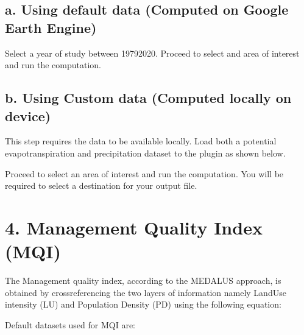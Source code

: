\documentclass[letterpaper,10pt,english]{sphinxmanual}
\begin{document}
\subsection{a. Using default data (Computed on Google Earth Engine)}
\label{\detokenize{Qgis_Plugin/Calculate_medalus:id1}}
\sphinxAtStartPar
Select a year of study between 1979\sphinxhyphen{}2020. Proceed to select and area of interest and run the computation.



\subsection{b. Using Custom data (Computed locally on device)}
\label{\detokenize{Qgis_Plugin/Calculate_medalus:id2}}
\sphinxAtStartPar
This step requires the data to be available locally. Load both a potential evapotranspiration and precipitation dataset to the
plugin as shown below.


\sphinxAtStartPar
Proceed to select an area of interest and run the computation. You will be required to select a destination for your
output file.


\section{4. Management Quality Index (MQI)}
\label{\detokenize{Qgis_Plugin/Calculate_medalus:management-quality-index-mqi}}
\sphinxAtStartPar
The Management quality index, according to the MEDALUS approach, is obtained by cross\sphinxhyphen{}referencing the two layers of information
namely Land\sphinxhyphen{}Use intensity (LU) and Population Density (PD) using the following equation:

\sphinxAtStartPar
{}

\sphinxAtStartPar
Default datasets used for MQI are:
\end{document}
